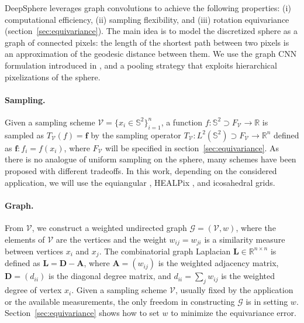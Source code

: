 \documentclass{article} %
\renewcommand{\b}[1]{{\bm{#1}}}  %
\newcommand{\R}{\mathbb{R}}
\renewcommand{\S}{\mathbb{S}}
\newcommand{\G}{\mathcal{G}}  %
\newcommand{\V}{\mathcal{V}}  %
\DeclareMathOperator*{\diag}{diag}
\newcommand{\figref}[1]{figure~\ref{fig:#1}}
\newcommand{\secref}[1]{section~\ref{sec:#1}}
\newcommand{\Secref}[1]{Section~\ref{sec:#1}}
\begin{document}
DeepSphere leverages graph convolutions to achieve the following properties: (i) computational efficiency, (ii) sampling flexibility, and (iii) rotation equivariance (\secref{equivariance}).
The main idea is to model the discretized sphere as a graph of connected pixels: the length of the shortest path between two pixels is an approximation of the geodesic distance between them.
We use the graph CNN formulation introduced in \citep{defferrard2016graphnn}, and a pooling strategy that exploits hierarchical pixelizations of the sphere.

\paragraph{Sampling.}
Given a sampling scheme $\V = \{x_i \in \S^2\}_{i=1}^n$, a function $f : \S^2 \supset F_\V \to \R$ is sampled as $T_\V(f) = \b{f}$ by the sampling operator $T_\V: L^2(\S^2) \supset F_\V \to \R^n$ defined as $\b{f}: f_i=f(x_i)$, where $F_\V$ will be specified in \secref{equivariance}.
As there is no analogue of uniform sampling on the sphere, many schemes have been proposed with different tradeoffs.
In this work, depending on the considered application, we will use the equiangular \citep{driscoll1994Fouriersphere}, HEALPix \citep{gorski2005healpix}, and icosahedral \citep{baumgardner1985icosahedral} grids.

\paragraph{Graph.}
From $\V$, we construct a weighted undirected graph $\G = (\V, w)$, where the elements of $\V$ are the vertices and the weight $w_{ij} = w_{ji}$ is a similarity measure between vertices $x_i$ and $x_j$.
The combinatorial graph Laplacian $\b{L} \in \R^{n \times n}$ is defined as $\b{L} = \b{D} - \b{A}$, where $\b{A} = (w_{ij})$ is the weighted adjacency matrix, $\b{D} = (d_{ii})$ is the diagonal degree matrix, and $d_{ii} = \sum_j w_{ij}$ is the weighted degree of vertex $x_i$.
Given a sampling scheme $\V$, usually fixed by the application or the available measurements, the only freedom in constructing $\G$ is in setting $w$.
\Secref{equivariance} shows how to set $w$ to minimize the equivariance error.
\end{document}
